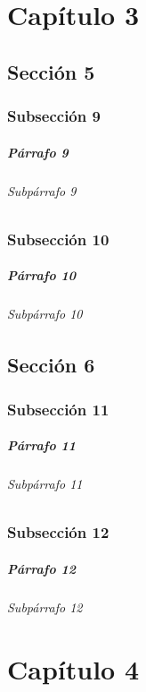 \documentclass[11pt,a4paper]{book}
\begin{document}
     \chapter{Capítulo 3}
      \section{Sección 5}
       \subsection{Subsección 9}
       \lipsum[1]
       \paragraph{Párrafo 9 }
       \lipsum[2] 
       \subparagraph{Subpárrafo 9} 
       \lipsum[4] 
       \subsection{Subsección 10}
       \lipsum[1]
       \paragraph{Párrafo 10 }
       \lipsum[2] 
       \subparagraph{Subpárrafo 10} 
       \lipsum[4] 
      \section{Sección 6}
       \subsection{Subsección 11}
       \lipsum[1]
       \paragraph{Párrafo 11 }
       \lipsum[2] 
       \subparagraph{Subpárrafo 11} 
       \lipsum[4] 
       \subsection{Subsección 12}
       \lipsum[1]
       \paragraph{Párrafo 12 }
       \lipsum[2] 
       \subparagraph{Subpárrafo 12} 
       \lipsum[4] 
     \chapter{Capítulo 4}
\end{document}
